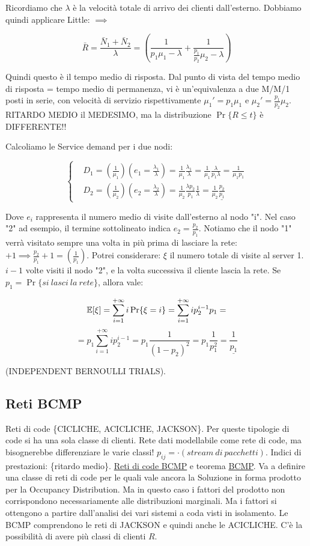 Ricordiamo che $\lambda$ è la velocità totale di arrivo dei clienti dall'esterno. Dobbiamo quindi applicare Little: $\implies$ 

\[
	\bar{R} = \frac{\bar{N}_1+\bar{N}_2}{\lambda} = (\frac{1}{p_1\mu_1-\lambda} + \frac{1}{\frac{p_1}{p_2}\mu_2-\lambda})
\]

Quindi questo è il tempo medio di risposta. Dal punto di vista del tempo medio di risposta = tempo medio di permanenza, vi è un'equivalenza a due M/M/1 posti in serie, con velocità di servizio rispettivamente $\mu_1'=p_1\mu_1$ e $\mu_2'=\frac{p_1}{p_2}\mu_2$. RITARDO MEDIO il MEDESIMO, ma la distribuzione $\Pr\{R\leq t\}$ è DIFFERENTE!!

Calcoliamo le Service demand per i due nodi:

\[
	\left\{
	\begin{aligned}
	&D_1 = (\frac{1}{\mu_1}){(e_1=\frac{\lambda_1}{\lambda})} = \frac{1}{\mu_1} \frac{\lambda_1}{\lambda} = \frac{1}{\mu_1} \frac{\lambda}{p_1 \lambda} = \frac{1}{\mu_1 p_1}\\
	&D_2 = (\frac{1}{\mu_2})(e_2=\frac{\lambda_2}{\lambda}) = \frac{1}{\mu_2}\frac{\lambda p_2}{p_1}\frac{1}{\lambda} = \frac{1}{\mu_2}\underline{\frac{p_2}{p_1}}
	\end{aligned}
	\right.
\]

Dove $e_i$ rappresenta il numero medio di visite dall'esterno al nodo "i". Nel caso "2" ad esempio, il termine sottolineato indica $e_2 = \frac{p_2}{p_1}$. Notiamo che il nodo "1" verrà visitato sempre una volta in più prima di lasciare la rete: $+1 \implies \frac{p_2}{p_1}+1 = (\frac{1}{p_1})$. Potrei considerare: $\xi$ il numero totale di visite al server 1. $i-1$ volte visiti il nodo "2", e la volta successiva il cliente lascia la rete. Se $p_1=\Pr\{si\ lasci\ la\ rete\}$, allora vale:

\[
	\operatorname{\mathbb{E}}[\xi] = \sum_{i=1}^{+\infty}{i\Pr\{\xi=i\}} = \sum_{i=1}^{+\infty}{ip_2^{i-1}p_1} =
\]
\[
	= p_1\sum_{i=1}^{+\infty}{ip_2^{i-1}} = p_1 \frac{1}{(1-p_2)^2} = p_1 \frac{1}{p_1^2} = \underline{\frac{1}{p_1}}
\]

(INDEPENDENT BERNOULLI TRIALS).


\subsection{Reti BCMP}

Reti di code \{CICLICHE, ACICLICHE, JACKSON\}. Per queste tipologie di code si ha una sola classe di clienti. Rete dati modellabile come rete di code, ma bisognerebbe differenziare le varie classi! $p_{ij} = \mathord{\cdot}(stream\ di\ pacchetti)$. Indici di prestazioni: \{ritardo medio\}. \underline{Reti di code BCMP} e teorema \underline{BCMP}. Va a definire una classe di reti di code per le quali vale ancora la Soluzione in forma prodotto per la Occupancy Distribution. Ma in questo caso i fattori del prodotto non corrispondono necessariamente alle distribuzioni marginali. Ma i fattori si ottengono a partire dall'analisi dei vari sistemi a coda visti in isolamento. Le BCMP comprendono le reti di JACKSON e quindi anche le ACICLICHE. C'è la possibilità di avere più classi di clienti $R$.

